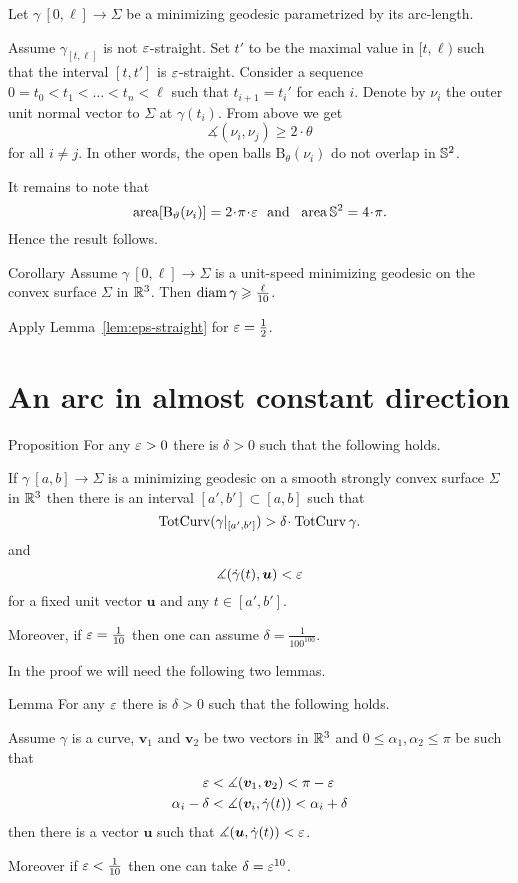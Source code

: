 \documentclass[a4paper,10pt]{article}
\begin{document}
Let $\gamma\:[0,\ell]\to \Sigma$ be a minimizing geodesic parametrized by its arc-length.

Assume $\gamma_{[t,\ell]}$ is not $\varepsilon$-straight.
Set $t'$ to be the maximal value in $[t,\ell)$ such that the  interval $[t,t']$ is $\varepsilon$-straight.
Consider a sequence $0=t_0<t_1<\dots<t_n<\ell$
such that $t_{i+1}=t_i'$ for each $i$.
Denote by $\nu_i$ the outer unit normal vector to $\Sigma$ at $\gamma(t_i)$. 
From above we get
\[\measuredangle(\nu_i,\nu_j)\ge2\cdot\theta\] for all $i\ne j$.
In other words, the open balls $\mathrm{B}_\theta(\nu_i)$ do not overlap 
in $\mathbb{S}^2$.

It remains to note that 
\[\area[\mathrm{B}_\theta(\nu_i)] =2\cdot\pi\cdot\eps
 \ \ \text{and}\ \ 
 \area\SS^2=4\cdot\pi.
\]
Hence the result follows.
\qeds

\begin{thm}{Corollary}\label{cor:length-diameter}
Assume $\gamma\:[0,\ell]\to \Sigma$ is a unit-speed minimizing geodesic on the convex surface $\Sigma$ in $\mathbb{R}^3$.
Then $\operatorname{diam} \gamma\geqslant \tfrac\ell{10}$.
\end{thm}

Apply Lemma~\ref{lem:eps-straight} for $\varepsilon=\tfrac12$.
\qeds


\section{An arc in almost constant direction}

\begin{thm}{Proposition}\label{prop:almost-const}
For any $\varepsilon>0$ there is $\delta>0$ such that the following holds.

If $\gamma\:[a,b]\to\Sigma$ is a minimizing geodesic 
on a smooth strongly convex surface $\Sigma$ in $\mathbb{R}^3$
then there is an interval $[a',b']\subset[a,b]$
such that 
\[\tc(\gamma|_{[a',b']})>\delta\cdot\tc\gamma.\]
and 
\[\measuredangle(\dot\gamma(t),\bm{u})<\varepsilon\] 
for a fixed unit vector $\bm{u}$
and any $t\in[a',b']$.

Moreover, if $\varepsilon=\tfrac1{10}$ then one can assume $\delta=\tfrac1{100^{100}}$.
\end{thm}

In the proof we will need the following two lemmas.

\begin{thm}{Lemma}\label{lem:almost-const-angles}
For any $\varepsilon$ there is $\delta>0$ such that the following holds.

Assume $\gamma$ is a curve,
$\bm{v}_1$ and $\bm{v}_2$  be two vectors in $\mathbb{R}^3$
and $0\le\alpha_1,\alpha_2\le\pi$ be such that
\begin{align*}
\varepsilon
&<\measuredangle(\bm{v}_1,\bm{v}_2)<\pi-\varepsilon
\\
\alpha_i-\delta
&<\measuredangle(\bm{v}_i,\dot\gamma(t))< \alpha_i+\delta
\end{align*}
then there is a vector $\bm{u}$ such that
$\measuredangle(\bm{u},\dot\gamma(t))<\varepsilon$.

Moreover if $\varepsilon<\tfrac1{10}$ 
then one can take $\delta=\varepsilon^{10}$.
\end{thm}
\end{document}
